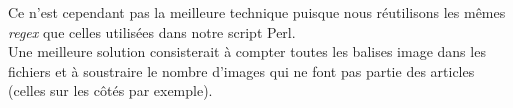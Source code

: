 Ce n'est cependant pas la meilleure technique puisque nous réutilisons les mêmes \textit{regex} que celles utilisées dans notre script Perl.\\
Une meilleure solution consisterait à compter toutes les balises image dans les fichiers et à soustraire le nombre d'images qui ne font pas partie des articles (celles sur les côtés par exemple).
